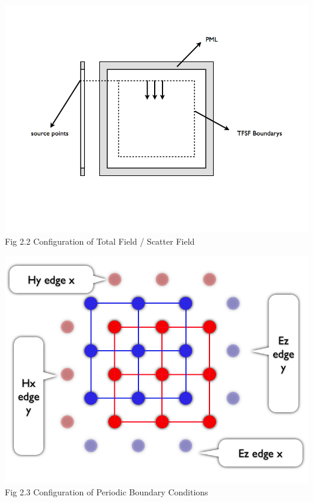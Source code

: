\documentclass[openany]{book}
\begin{document}
\begin{center}
\includegraphics[scale=0.5]{images/tfsf.jpg}\\
Fig 2.2
Configuration of Total Field / Scatter Field 
\end{center}

\begin{center}
\includegraphics[scale=0.5]{images/pbc.jpg}\\
Fig 2.3
Configuration of Periodic Boundary Conditions
\end{center}
\end{document}
